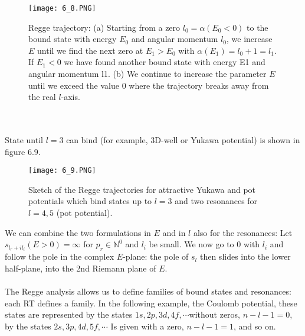 \begin{figure}[ht]
    \centering
    \texttt{[image: 6\_8.PNG]}
    \caption{Regge trajectory: (a) Starting from a zero $l_0 = \alpha (E_0 <0)$ to the bound state with energy $E_0$ and angular momentum $l_0$, we increase $E$ until we find the next zero at $E_1> E_0$ with $\alpha (E_1) = l_0 + 1 = l_1$. If $E_1 <0$ we have found another bound state with energy E1 and angular momentum l1. (b) We continue to increase the parameter $E$ until we exceed the value 0 where the trajectory breaks away from the real $l$-axis.}
\end{figure}
\\\\
State until $l = 3$ can bind (for example, 3D-well or Yukawa potential) is shown in figure 6.9.
\begin{figure}[ht]
    \begin{minipage}{0.5\textwidth}
        \centering
        \texttt{[image: 6\_9.PNG]}
    \end{minipage}
    \begin{minipage}{0.5\textwidth}
        \caption{Sketch of the Regge trajectories for attractive Yukawa and pot potentials which bind states up to $l = 3$ and two resonances for
        $l = 4, 5$ (pot potential).}
    \end{minipage}
\end{figure}
We can combine the two formulations in $E$ and in $l$ also for the resonances: Let $s_{l_r + il_i} (E> 0) = \infty$ for $p_r\in\mathbb{N}^0$ and $l_i$ be small. We now go to 0 with $l_i$ and follow the pole in the complex $E$-plane: the pole of $s_l$ then slides into the lower half-plane, into the 2nd Riemann plane of $E$.
\\\\
The Regge analysis allows us to define families of bound states and resonances: each RT defines a family. In the following example, the Coulomb potential, these states are represented by the states $1s, 2p, 3d, 4f,\cdots$without zeros, $n - l - 1 = 0$, by the states $2s, 3p, 4d, 5f , \cdots$ Is given with a zero, $n - l - 1 = 1$, and so on.

